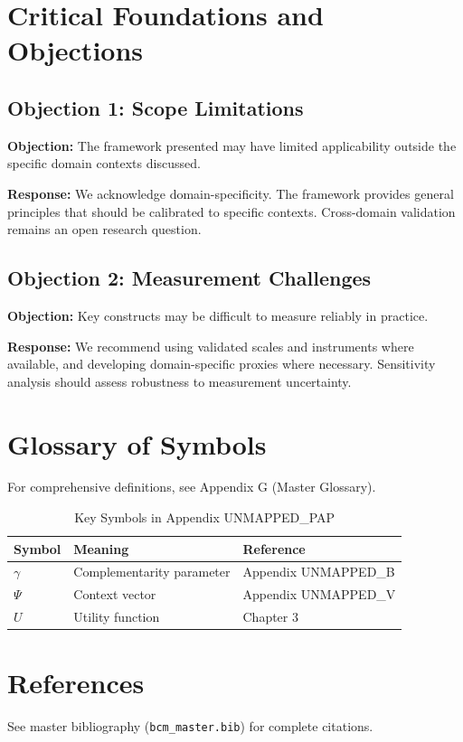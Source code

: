 
\section{Critical Foundations and Objections}
\label{sec:pap-foundations}

\subsection{Objection 1: Scope Limitations}

\textbf{Objection:} The framework presented may have limited applicability
outside the specific domain contexts discussed.

\textbf{Response:} We acknowledge domain-specificity. The framework provides
general principles that should be calibrated to specific contexts. Cross-domain
validation remains an open research question.

\subsection{Objection 2: Measurement Challenges}

\textbf{Objection:} Key constructs may be difficult to measure reliably in
practice.

\textbf{Response:} We recommend using validated scales and instruments where
available, and developing domain-specific proxies where necessary. Sensitivity
analysis should assess robustness to measurement uncertainty.



\section{Glossary of Symbols}
\label{sec:pap-glossary}

For comprehensive definitions, see Appendix G (Master Glossary).

\begin{table}[htbp]
\centering
\caption{Key Symbols in Appendix UNMAPPED_PAP}
\begin{tabular}{lll}
\toprule
\textbf{Symbol} & \textbf{Meaning} & \textbf{Reference} \\
\midrule
$\gamma$ & Complementarity parameter & Appendix UNMAPPED_B \\
$\Psi$ & Context vector & Appendix UNMAPPED_V \\
$U$ & Utility function & Chapter 3 \\
\bottomrule
\end{tabular}
\end{table}


\section{References}
\label{sec:references}

See master bibliography (\texttt{bcm\_master.bib}) for complete citations.

\nocite{bcm_master}



